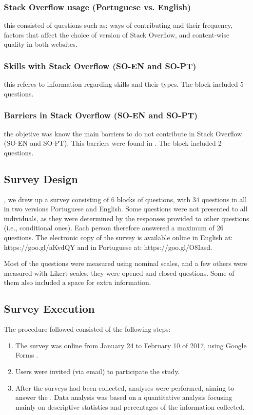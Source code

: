 \subsubsection{Stack Overflow usage (Portuguese vs. English)} this consisted of questions such as: ways of contributing and their frequency, factors that affect the choice of version of Stack Overflow, and content-wise quality in both websites.
\subsubsection{Skills with Stack Overflow (SO-EN and SO-PT)} this referes to information regarding skills and their types. The block included 5 questions.
\subsubsection{Barriers in Stack Overflow (SO-EN and SO-PT)} the objetive was know the main barriers to do not contribute in Stack Overflow (SO-EN and SO-PT). This barriers were found in \cite{Ford2016Paradise}. The block included 2 questions.
\subsection{Survey Design}
, we drew up a survey consisting of 6 blocks of questions, with 34 questions in all in two versions Portuguese and English. Some questions were not presented to all individuals, as they were determined by the responses provided to other questions (i.e., conditional ones). Each person therefore answered a maximum of 26 questions. The electronic copy of the survey is available online in English at: https://goo.gl/aKvdQY and in Portuguese at: https://goo.gl/O8Iasd.

Most of the questions were measured using nominal scales, and a few others were measured with Likert scales, they were opened and closed questions. Some of them also included a space for extra information.
\subsection{Survey Execution}
The procedure followed consisted of the following steps:
\begin{enumerate}	
	\item The survey was online from January 24 to February 10 of 2017, using Google Forms \cite{Google}.
	\item Users were invited (via email) to participate the study. 
	\item After the surveys had been collected, analyses were performed, aiming to answer the . Data analysis was based on a quantitative analysis focusing mainly on descriptive statistics and percentages of the information collected. 
\end{enumerate}